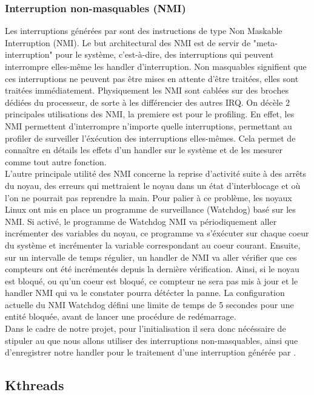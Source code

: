 					\subsubsection{Interruption non-masquables (NMI)}
						Les interruptions générées par \IBS sont des instructions de type Non Maskable Interruption (NMI). Le but architectural des NMI est de servir de "meta-interruption" pour le système, c'est-à-dire, des interruptions qui peuvent interrompre elles-même les handler d'interruption. Non masquables signifient que ces interruptions ne peuvent pas être mises en attente d'être traitées, elles sont traitées immédiatement. Physiquement les NMI sont cablées sur des broches dédiées du processeur, de sorte à les différencier des autres IRQ. On décèle 2 principales utilisations des NMI, la premiere est pour le profiling. En effet, les NMI permettent d'interrompre n'importe quelle interruptions, permettant au profiler de surveiller l'éxécution des interruptions elles-mêmes. Cela permet de connaître en détails les effets d'un handler sur le système et de les mesurer comme tout autre fonction.\\
						L'autre principale utilité des NMI concerne la reprise d'activité suite à des arrêts du noyau, des erreurs qui mettraient le noyau dans un état d'interblocage et où l'on ne pourrait pas reprendre la main. Pour palier à ce problème, les noyaux Linux ont mis en place un programme de surveillance (Watchdog) basé sur les NMI. Si activé, le programme de Watchdog NMI va périodiquement aller incrémenter des variables du noyau, ce programme va s'éxécuter sur chaque coeur du système et incrémenter la variable correspondant au coeur courant. Ensuite, sur un intervalle de temps régulier, un handler de NMI va aller vérifier que ces compteurs ont été incrémentés depuis la dernière vérification. Ainsi, si le noyau est bloqué, ou qu'un coeur est bloqué, ce compteur ne sera pas mis à jour et le handler NMI qui va le constater pourra détécter la panne. La configuration actuelle du NMI Watchdog défini une limite de temps de 5 secondes pour une entité bloquée, avant de lancer une procédure de redémarrage.\\
						Dans le cadre de notre projet, pour l'initialisation il sera donc nécéssaire de stipuler au \lap que nous allons utiliser des interruptions non-masquables, ainsi que d'enregistrer notre handler pour le traitement d'une interruption générée par \IBS.
				\subsection{Kthreads}
